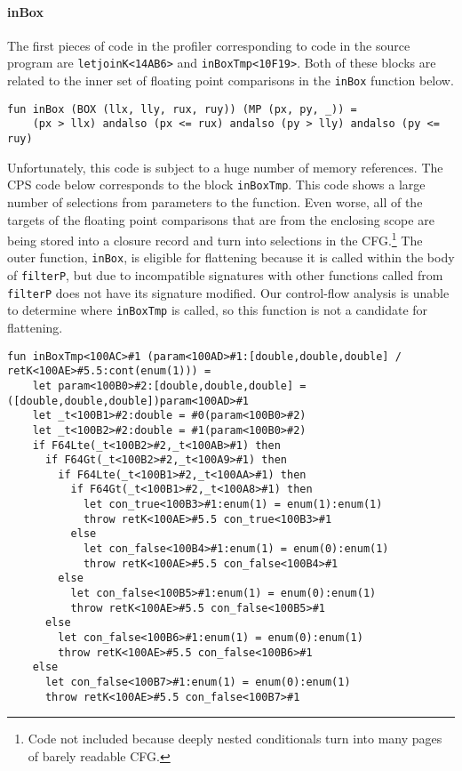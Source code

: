 \documentclass[11pt]{article}
\begin{document}
\paragraph{inBox}

The first pieces of code in the profiler corresponding to code in the source program are \texttt{letjoinK<14AB6>} and \texttt{inBoxTmp<10F19>}.
Both of these blocks are related to the inner set of floating point comparisons in the \texttt{inBox} function below.

\begin{lstlisting}
fun inBox (BOX (llx, lly, rux, ruy)) (MP (px, py, _)) =
    (px > llx) andalso (px <= rux) andalso (py > lly) andalso (py <= ruy)
\end{lstlisting}

Unfortunately, this code is subject to a huge number of memory references.
The CPS code below corresponds to the block \texttt{inBoxTmp}.
This code shows a large number of selections from parameters to the function.
Even worse, all of the targets of the floating point comparisons that are from the enclosing scope are being stored into a closure record and turn into selections in the CFG.\footnote{Code not included because deeply nested conditionals turn into many pages of barely readable CFG.} 
The outer function, \texttt{inBox}, is eligible for flattening  because it is called within the body of \texttt{filterP}, but due to incompatible signatures with other functions called from \texttt{filterP} does not have its signature modified.
Our control-flow analysis is unable to determine where \texttt{inBoxTmp} is called, so this function is not a candidate for flattening.
 
\begin{lstlisting}
fun inBoxTmp<100AC>#1 (param<100AD>#1:[double,double,double] / retK<100AE>#5.5:cont(enum(1))) =
    let param<100B0>#2:[double,double,double] = ([double,double,double])param<100AD>#1
    let _t<100B1>#2:double = #0(param<100B0>#2)
    let _t<100B2>#2:double = #1(param<100B0>#2)
    if F64Lte(_t<100B2>#2,_t<100AB>#1) then
      if F64Gt(_t<100B2>#2,_t<100A9>#1) then
        if F64Lte(_t<100B1>#2,_t<100AA>#1) then
          if F64Gt(_t<100B1>#2,_t<100A8>#1) then
            let con_true<100B3>#1:enum(1) = enum(1):enum(1)
            throw retK<100AE>#5.5 con_true<100B3>#1
          else
            let con_false<100B4>#1:enum(1) = enum(0):enum(1)
            throw retK<100AE>#5.5 con_false<100B4>#1
        else
          let con_false<100B5>#1:enum(1) = enum(0):enum(1)
          throw retK<100AE>#5.5 con_false<100B5>#1
      else
        let con_false<100B6>#1:enum(1) = enum(0):enum(1)
        throw retK<100AE>#5.5 con_false<100B6>#1
    else
      let con_false<100B7>#1:enum(1) = enum(0):enum(1)
      throw retK<100AE>#5.5 con_false<100B7>#1
\end{lstlisting}
\end{document}
